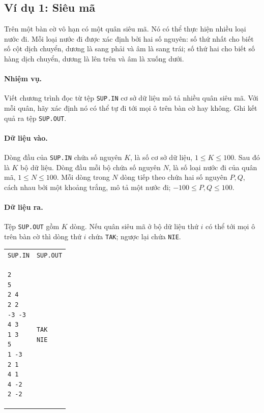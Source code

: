 \documentclass[11pt]{article}
\begin{document}
\subsection*{Ví dụ 1: Siêu mã}

Trên một bàn cờ vô hạn có một quân siêu mã. Nó có thể thực hiện nhiều loại
nước đi. Mỗi loại nước đi được xác định bởi hai số nguyên: số thứ nhất cho
biết số cột dịch chuyển, dương là sang phải và âm là sang trái; số thứ hai cho
biết số hàng dịch chuyển, dương là lên trên và âm là xuống dưới.

\paragraph{Nhiệm vụ.}
Viết chương trình đọc từ tệp \texttt{SUP.IN} cơ sở dữ liệu mô tả nhiều quân
siêu mã. Với mỗi quân, hãy xác định nó có thể tự đi tới mọi ô trên bàn cờ hay
không. Ghi kết quả ra tệp \texttt{SUP.OUT}.

\paragraph{Dữ liệu vào.}
Dòng đầu của \texttt{SUP.IN} chứa số nguyên \(K\), là số cơ sở dữ liệu,
\(1\le K\le 100\). Sau đó là \(K\) bộ dữ liệu. Dòng đầu mỗi bộ chứa số nguyên
\(N\), là số loại nước đi của quân mã, \(1\le N\le 100\). Mỗi dòng trong
\(N\) dòng tiếp theo chứa hai số nguyên \(P,Q\), cách nhau bởi một khoảng
trắng, mô tả một nước đi; \(-100\le P,Q\le 100\).

\paragraph{Dữ liệu ra.}
Tệp \texttt{SUP.OUT} gồm \(K\) dòng. Nếu quân siêu mã ở bộ dữ liệu thứ \(i\)
có thể tới mọi ô trên bàn cờ thì dòng thứ \(i\) chứa \texttt{TAK}; ngược lại
chứa \texttt{NIE}.

\begin{center}
\begin{tabular}{ll}
\texttt{SUP.IN} & \texttt{SUP.OUT}\\
\begin{minipage}{0.35\linewidth}
\begin{verbatim}
2
5
2 4
2 2
-3 -3
4 3
1 3
5
1 -3
2 1
4 1
4 -2
2 -2
\end{verbatim}
\end{minipage}
&
\begin{minipage}{0.2\linewidth}
\begin{verbatim}
TAK
NIE
\end{verbatim}
\end{minipage}
\end{tabular}
\end{center}
\end{document}
